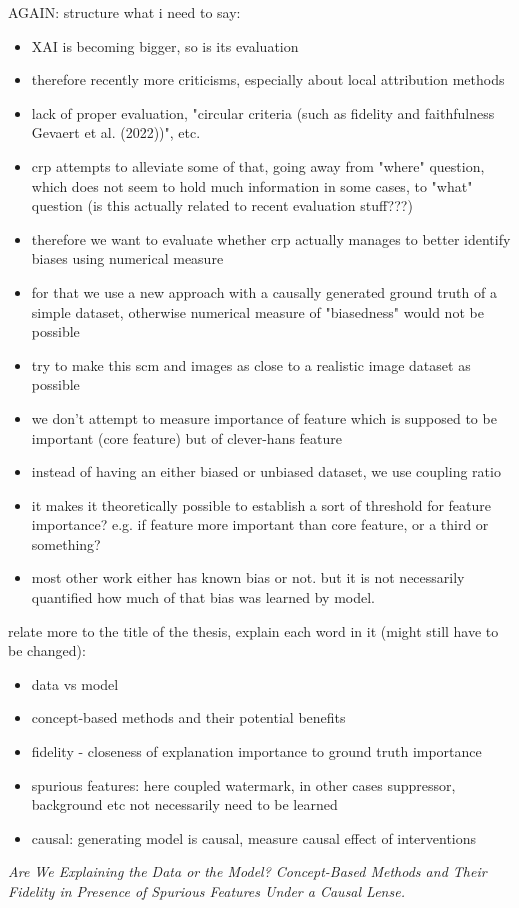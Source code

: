 AGAIN: structure what i need to say:
\begin{itemize}
    \item XAI is becoming bigger, so is its evaluation
    \item therefore recently more criticisms, especially about local attribution methods
    \item lack of proper evaluation, "circular criteria (such as fidelity and faithfulness Gevaert et al. (2022))", \cite{Adebayo2018, Sixt2020, Wilming2023} etc.
    \item crp attempts to alleviate some of that, going away from "where" question, which does not seem to hold much information in some cases, to "what" question (is this actually related to recent evaluation stuff???)
    \item therefore we want to evaluate whether crp actually manages to better identify biases using numerical measure
    \item for that we use a new approach with a causally generated ground truth of a simple dataset, otherwise numerical measure of "biasedness" would not be possible
    \item try to make this scm and images as close to a realistic image dataset as possible
    \item we don't attempt to measure importance of feature which is supposed to be important (core feature) but of clever-hans feature
    \item instead of having an either biased or unbiased dataset, we use coupling ratio
    \item it makes it theoretically possible to establish a sort of threshold for feature importance? e.g. if feature more important than core feature, or a third or something?
    \item most other work either has known bias or not. but it is not necessarily quantified how much of that bias was learned by model. 
\end{itemize}


relate more to the title of the thesis, explain each word in it (might still have to be changed):
\begin{itemize}
    \item data vs model
    \item concept-based methods and their potential benefits
    \item fidelity - closeness of explanation importance to ground truth importance
    \item spurious features: here coupled watermark, in other cases suppressor, background etc not necessarily need to be learned
    \item causal: generating model is causal, measure causal effect of interventions
\end{itemize}
\textit{Are We Explaining the Data or the Model?
    Concept-Based Methods and Their Fidelity in Presence of Spurious Features Under a Causal Lense.}


